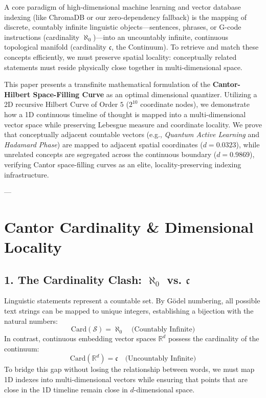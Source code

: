 \documentclass[11pt,twocolumn]{article}
\begin{document}
A core paradigm of high-dimensional machine learning and vector database indexing (like ChromaDB or our zero-dependency fallback) is the mapping of discrete, countably infinite linguistic objects—sentences, phrases, or G-code instructions (cardinality \textbf{$\aleph_0$})—into an uncountably infinite, continuous topological manifold (cardinality \textbf{$\mathfrak{c}$}, the Continuum). To retrieve and match these concepts efficiently, we must preserve spatial locality: conceptually related statements must reside physically close together in multi-dimensional space.

This paper presents a transfinite mathematical formulation of the \textbf{Cantor-Hilbert Space-Filling Curve} as an optimal dimensional quantizer. Utilizing a 2D recursive Hilbert Curve of Order $5$ ($2^{10}$ coordinate nodes), we demonstrate how a 1D continuous timeline of thought is mapped into a multi-dimensional vector space while preserving Lebesgue measure and coordinate locality. We prove that conceptually adjacent countable vectors (e.g., \textit{Quantum Active Learning} and \textit{Hadamard Phase}) are mapped to adjacent spatial coordinates ($d = 0.0323$), while unrelated concepts are segregated across the continuous boundary ($d = 0.9869$), verifying Cantor space-filling curves as an elite, locality-preserving indexing infrastructure.

---

\section{Cantor Cardinality & Dimensional Locality}

\subsection{1. The Cardinality Clash: $\aleph_0$ vs. $\mathfrak{c}$}
Linguistic statements represent a countable set. By Gödel numbering, all possible text strings can be mapped to unique integers, establishing a bijection with the natural numbers:
$$\text{Card}(\mathcal{S}) = \aleph_0 \quad \text{(Countably Infinite)}$$
In contrast, continuous embedding vector spaces $\mathbb{R}^d$ possess the cardinality of the continuum:
$$\text{Card}(\mathbb{R}^d) = \mathfrak{c} \quad \text{(Uncountably Infinite)}$$
To bridge this gap without losing the relationship between words, we must map 1D indexes into multi-dimensional vectors while ensuring that points that are close in the 1D timeline remain close in $d$-dimensional space.
\end{document}
